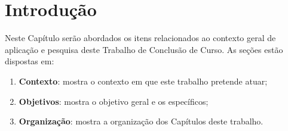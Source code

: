 \newpage\null\thispagestyle{empty}\newpage
\chapter{Introdução}
\label{chap:intro}

Neste Capítulo serão abordados os itens relacionados ao contexto geral de
aplicação e pesquisa deste Trabalho de Conclusão de Curso. As seções estão
dispostas em:

\begin{enumerate}
  \item \textbf{Contexto}: mostra o contexto em que este trabalho pretende
    atuar;
  \item \textbf{Objetivos}: mostra o objetivo geral e os específicos;
  \item \textbf{Organização}: mostra a organização dos Capítulos deste
    trabalho.
\end{enumerate}





